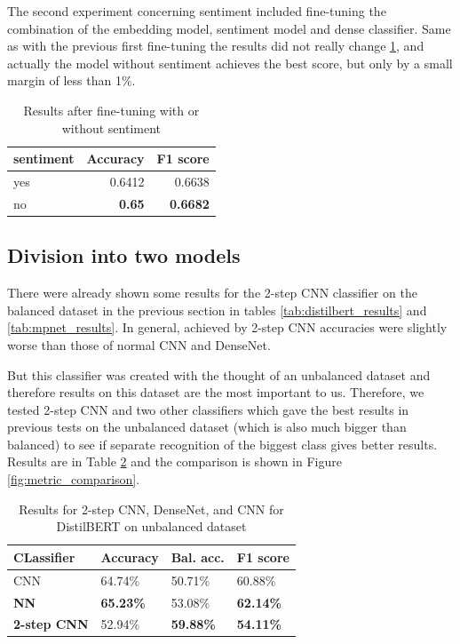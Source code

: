 The second experiment concerning sentiment included fine-tuning the combination of the embedding model, sentiment model and dense classifier. Same as with the previous first fine-tuning the results did not really change \ref{tab:sentiment_tuning_results}, and actually the model without sentiment achieves the best score, but only by a small margin of less than 1\%. 

\begin{table}[h]
\centering
\begin{tabular}{l|r|r}
 \textbf{sentiment}& \textbf{Accuracy} & \textbf{F1 score} \\\hline
yes &  0.6412 & 0.6638 \\
no &  \textbf{0.65} & \textbf{0.6682} \\
\end{tabular}
\caption{Results after fine-tuning with or without sentiment}
\label{tab:sentiment_tuning_results}
\end{table}

\subsection{Division into two models}

There were already shown some results for the 2-step CNN classifier on the balanced dataset in the previous section in tables \ref{tab:distilbert_results} and \ref{tab:mpnet_results}. In general, achieved by 2-step CNN accuracies were slightly worse than those of normal CNN and DenseNet.

But this classifier was created with the thought of an unbalanced dataset and therefore results on this dataset are the most important to us.  Therefore, we tested 2-step CNN and two other classifiers which gave the best results in previous tests on the unbalanced dataset (which is also much bigger than balanced) to see if separate recognition of the biggest class gives better results. Results are in Table \ref{tab:unbalanced_results_2_step} and the comparison is shown in Figure \ref{fig:metric_comparison}.

\begin{table}[!h]
\centering
\begin{tabular}{l|l|l|l}
\textbf{CLassifier} & \textbf{Accuracy} & \textbf{Bal. acc.} & \textbf{F1 score} \\ \hline
CNN                 & 64.74\%           & 50.71\%                & 60.88\%           \\
\textbf{NN}         & \textbf{65.23\%}  & 53.08\%                & \textbf{62.14\%}  \\
\textbf{2-step CNN} & 52.94\%           & \textbf{59.88\%}       & \textbf{54.11\%} 
\end{tabular}
\caption{Results for 2-step CNN, DenseNet, and CNN for DistilBERT on unbalanced dataset}
\label{tab:unbalanced_results_2_step}
\end{table}

